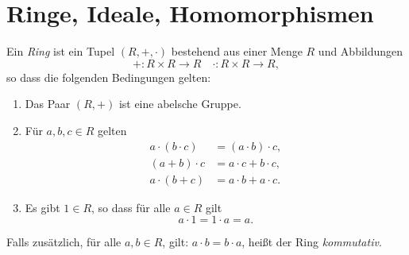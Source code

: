 \documentclass{book}
\begin{document}
\section{Ringe, Ideale, Homomorphismen }%
\label{sec:ringe_ideale_homomorphismen}

\begin{defi}
    \label{defi:ring}
    Ein {\em Ring} ist ein Tupel $(R,+,\cdot)$ bestehend aus einer Menge
    $R$ und Abbildungen 
    \[
        + : R \times R \to R \quad \cdot : R \times R \to R,
    \]
    so dass die folgenden Bedingungen gelten:
    \begin{enumerate}
        \item Das Paar $(R,+)$ ist eine abelsche Gruppe.
        \item Für $a,b,c \in R$ gelten 
            \begin{align*}
                a \cdot (b \cdot c)  & = (a \cdot b) \cdot c,\\
                (a+b) \cdot c  & = a \cdot c + b \cdot c,\\
                a \cdot (b+c)  & = a \cdot b + a \cdot c.
            \end{align*}
        \item Es gibt $1 \in R$, so dass für alle $a \in R$ gilt
            \[
                a \cdot 1 = 1 \cdot a = a.
            \]
    \end{enumerate}
    Falls zusätzlich, für alle $a,b \in R$, gilt: $a \cdot b = b \cdot a$,
    heißt der Ring {\em kommutativ}.
\end{defi}
\end{document}

